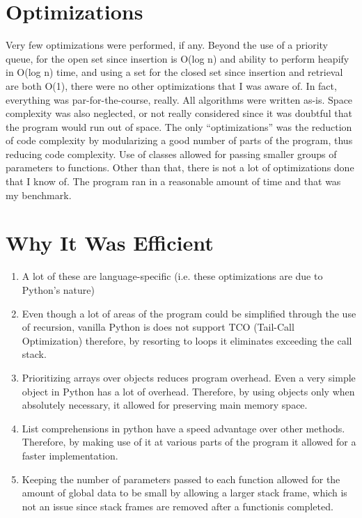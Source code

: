 \documentclass{article}
\begin{document}
\section{Optimizations}
Very few optimizations were performed, if any. Beyond the use of a priority queue, for
the open set since insertion is O(log n) and ability to perform heapify in O(log n) time,
and using a set for the closed set since insertion and retrieval are both O(1), there
were no other optimizations that I was aware of. In fact, everything was par-for-the-course,
really. All algorithms were written as-is. Space complexity was also neglected, or not really
considered since it was doubtful that the program would run out of space. The only
``optimizations'' was the reduction of code complexity by modularizing a good number of parts
of the program, thus reducing code complexity. Use of classes allowed for passing smaller
groups of parameters to functions. Other than that, there is not a lot of optimizations done
that I know of. The program ran in a reasonable amount of time and that was my benchmark.
\section{Why It Was Efficient}
\begin{enumerate}
    \item A lot of these are language-specific (i.e. these optimizations are due to Python's nature)
    \item Even though a lot of areas of the program could be simplified through the use of recursion,
        vanilla Python is does not support TCO (Tail-Call Optimization) therefore, by resorting
        to loops it eliminates exceeding the call stack.
    \item Prioritizing arrays over objects reduces program overhead. Even a very simple object in
        Python has a lot of overhead. Therefore, by using objects only when absolutely necessary,
        it allowed for preserving main memory space.
    \item List comprehensions in python have a speed advantage over other methods. Therefore,
        by making use of it at various parts of the program it allowed for a faster implementation.
    \item Keeping the number of parameters passed to each function allowed for the amount of global data
        to be small by allowing a larger stack frame, which is not an issue since stack frames are
        removed after a functionis completed.
\end{enumerate}
\end{document}
